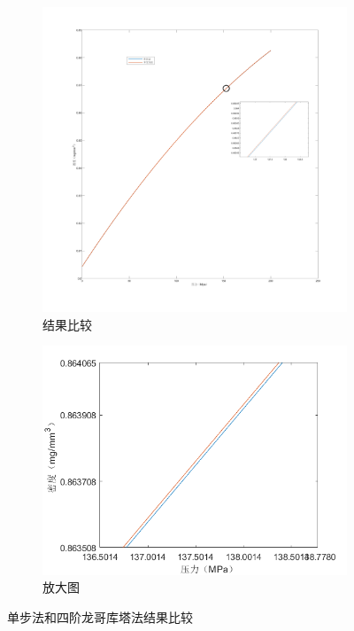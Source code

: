 \documentclass{article}
\newcounter{sub}
\begin{document}
\begin{figure}[htpb]
	\centering
	\begin{subfigure}[htpb]{.45\linewidth}
		\centering
		\includegraphics[width=\linewidth]{1-1.png}
		\caption{结果比较}
		\label{fig:结果比较}
	\end{subfigure}
	\quad
	\begin{subfigure}[htpb]{.45\linewidth}

		\centering
		\includegraphics[width=\linewidth]{1-2.png}
		\caption{放大图}
		\label{fig:放大图}
	\end{subfigure}
	\caption{单步法和四阶龙哥库塔法结果比较}
	\label{fig:单步法和四阶龙哥库塔法结果比较}
\end{figure}
\end{document}
